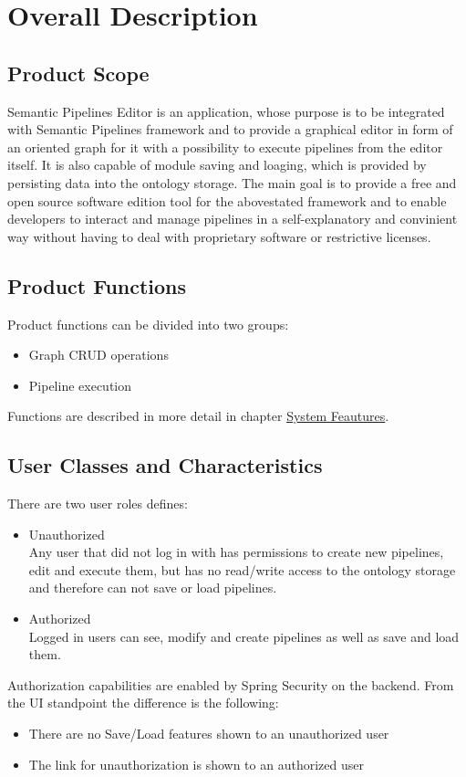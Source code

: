 \documentclass{article}
\begin{document}
\section{Overall Description}
\subsection{Product Scope}
Semantic Pipelines Editor is an application, whose purpose is to be integrated with Semantic Pipelines framework and to provide a graphical editor in form of an oriented graph for it with a possibility to execute pipelines from the editor itself. It is also capable of module saving and loaging, which is provided by persisting data into the ontology storage. The main goal is to provide a free and open source software edition tool for the abovestated framework and to enable developers to interact and manage pipelines in a self-explanatory and convinient way without having to deal with proprietary software or restrictive licenses.
\subsection{Product Functions}
Product functions can be divided into two groups:
\begin{itemize}
    \item Graph CRUD operations
    \item Pipeline execution
\end{itemize}
Functions are described in more detail in chapter \hyperref[sec:features]{System Feautures}.
\subsection{User Classes and Characteristics}
There are two user roles defines:
\begin{itemize}
    \item Unauthorized\\
	Any user that did not log in with has permissions to create new pipelines, edit and execute them, but has no read/write access to the ontology storage and therefore can not save or load pipelines.
    \item Authorized\\
	Logged in users can see, modify and create pipelines as well as save and load them.
\end{itemize}
Authorization capabilities are enabled by Spring Security on the backend. From the UI standpoint the difference is the following:
\begin{itemize}
    \item There are no Save/Load features shown to an unauthorized user
    \item The link for unauthorization is shown to an authorized user
\end{itemize}
\end{document}
